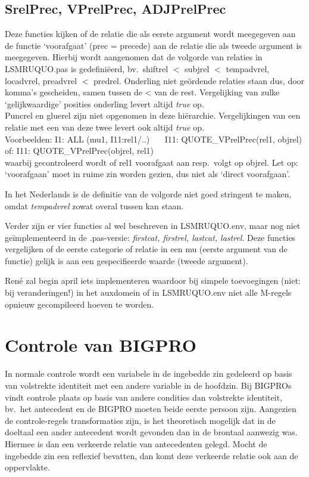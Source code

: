 \subsection{SrelPrec, VPrelPrec, ADJPrelPrec}
Deze functies kijken of de relatie die als eerste argument wordt meegegeven aan 
de functie `voorafgaat' (prec = precede) aan de relatie die als tweede argument 
is meegegeven. Hierbij wordt aangenomen dat de volgorde van relaties in 
LSMRUQUO.pas is gedefini\"{e}erd, bv.\ shiftrel $<$ subjrel $<$ tempadvrel, 
locadvrel, preadvrel $<$ predrel. Onderling niet ge\"{o}rdende relaties staan 
dus, door komma's gescheiden, samen tussen de < van de rest. Vergelijking van 
zulke `gelijkwaardige' posities onderling levert altijd {\em true\/} op. \\
Puncrel en gluerel 
zijn niet opgenomen in deze hi\"{e}rarchie. Vergelijkingen van een relatie met 
een van deze twee levert ook altijd {\em true\/} op.\\
Voorbeelden: I1: ALL (mu1, I11:rel1/..) \ \ \ I11: QUOTE\_VPrelPrec(rel1, 
objrel)\\
of: I11: QUOTE\_VPrelPrec(objrel, rel1)\\
waarbij gecontroleerd wordt of rel1 voorafgaat aan resp.\ volgt op objrel. Let 
op: `voorafgaan' moet in ruime zin worden gezien, dus niet als `direct 
voorafgaan'.

In het Nederlands is de definitie van de volgorde niet goed stringent te maken, 
omdat {\em tempadvrel\/} zowat overal tussen kan staan.

Verder zijn er vier functies al wel beschreven in LSMRUQUO.env, maar nog niet 
ge\"{i}mplementeerd in de .pas-versie: {\em firstcat, firstrel, lastcat, 
lastrel}. Deze functies vergelijken of de eerste 
categorie of relatie in een mu (eerste argument van de functie) gelijk is aan 
een gespecifieerde waarde (tweede argument).

Ren\'{e} zal begin april iets implementeren waardoor bij simpele toevoegingen 
(niet: bij veranderingen!) in het auxdomein of in LSMRUQUO.env niet alle 
M-regels opnieuw gecompileerd hoeven te worden.

\section{Controle van BIGPRO}
In normale controle wordt een variabele in de ingebedde zin gedeleerd op basis 
van volstrekte identiteit met 
een andere variable in de hoofdzin. Bij BIGPROs vindt controle plaats op basis 
van andere condities dan volstrekte identiteit, bv.\ het antecedent en de 
BIGPRO moeten beide eerste persoon zijn. Aangezien de controle-regels 
transformaties zijn, is het theoretisch mogelijk dat in de doeltaal een ander
antecedent wordt gevonden dan in de brontaal aanwezig was. Hiermee is dan een 
verkeerde relatie van antecedenten gelegd. Mocht de ingebedde zin een reflexief 
bevatten, dan komt deze verkeerde relatie ook aan de oppervlakte.

